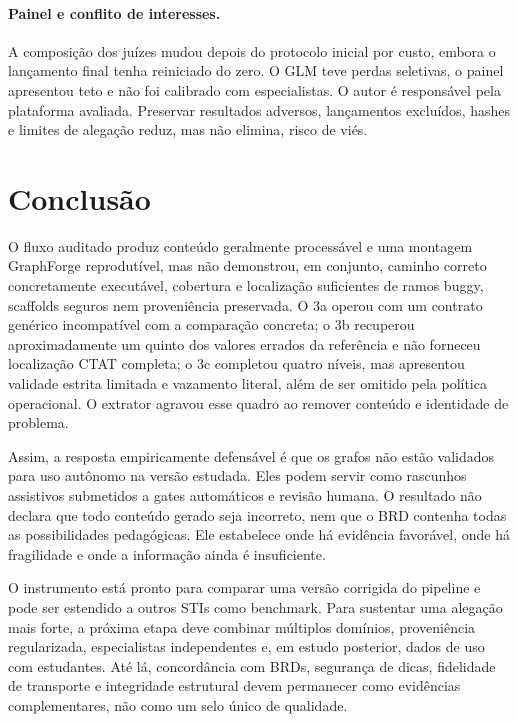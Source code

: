 \documentclass[11pt,a4paper]{article}
\begin{document}
\paragraph{Painel e conflito de interesses.} A composição dos juízes mudou depois do protocolo inicial por custo, embora o lançamento final tenha reiniciado do zero. O GLM teve perdas seletivas, o painel apresentou teto e não foi calibrado com especialistas. O autor é responsável pela plataforma avaliada. Preservar resultados adversos, lançamentos excluídos, hashes e limites de alegação reduz, mas não elimina, risco de viés.

\section{Conclusão}

O fluxo auditado produz conteúdo geralmente processável e uma montagem GraphForge reprodutível, mas não demonstrou, em conjunto, caminho correto concretamente executável, cobertura e localização suficientes de ramos buggy, scaffolds seguros nem proveniência preservada. O 3a operou com um contrato genérico incompatível com a comparação concreta; o 3b recuperou aproximadamente um quinto dos valores errados da referência e não forneceu localização CTAT completa; o 3c completou quatro níveis, mas apresentou validade estrita limitada e vazamento literal, além de ser omitido pela política operacional. O extrator agravou esse quadro ao remover conteúdo e identidade de problema.

Assim, a resposta empiricamente defensável é que os grafos não estão validados para uso autônomo na versão estudada. Eles podem servir como rascunhos assistivos submetidos a gates automáticos e revisão humana. O resultado não declara que todo conteúdo gerado seja incorreto, nem que o BRD contenha todas as possibilidades pedagógicas. Ele estabelece onde há evidência favorável, onde há fragilidade e onde a informação ainda é insuficiente.

O instrumento está pronto para comparar uma versão corrigida do pipeline e pode ser estendido a outros STIs como benchmark. Para sustentar uma alegação mais forte, a próxima etapa deve combinar múltiplos domínios, proveniência regularizada, especialistas independentes e, em estudo posterior, dados de uso com estudantes. Até lá, concordância com BRDs, segurança de dicas, fidelidade de transporte e integridade estrutural devem permanecer como evidências complementares, não como um selo único de qualidade.
\end{document}
